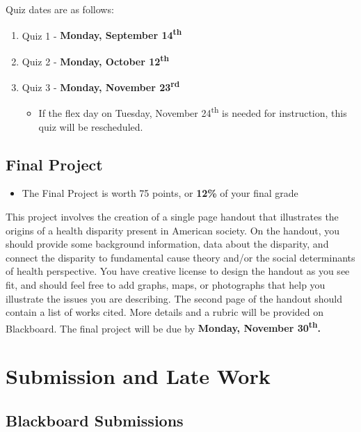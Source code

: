 \documentclass[
]{book}
\providecommand{\tightlist}{%
  \setlength{\itemsep}{0pt}\setlength{\parskip}{0pt}}
\newenvironment{rmdblock}[1]
  {\begin{shaded*}
  \begin{itemize}
  \renewcommand{\labelitemi}{
    \raisebox{-.7\height}[0pt][0pt]{
      {\setkeys{Gin}{width=3em,keepaspectratio}\texttt{[image: images/\#1]}}
    }
  }
  \item
  }
  {
  \end{itemize}
  \end{shaded*}
  }
\newenvironment{rmdtip}
  {\begin{rmdblock}{tip}}
  {\end{rmdblock}}
\begin{document}
Quiz dates are as follows:

\begin{enumerate}
\def\labelenumi{\arabic{enumi}.}
\tightlist
\item
  Quiz 1 - \textbf{Monday, September 14\textsuperscript{th}}
\item
  Quiz 2 - \textbf{Monday, October 12\textsuperscript{th}}
\item
  Quiz 3 - \textbf{Monday, November 23\textsuperscript{rd}}

  \begin{itemize}
  \tightlist
  \item
    If the flex day on Tuesday, November 24\textsuperscript{th} is needed for instruction, this quiz will be rescheduled.
  \end{itemize}
\end{enumerate}

\hypertarget{final-project}{%
\subsection{Final Project}\label{final-project}}

\begin{rmdtip}
The Final Project is worth 75 points, or \textbf{12\%} of your final
grade
\end{rmdtip}

This project involves the creation of a single page handout that illustrates the origins of a health disparity present in American society. On the handout, you should provide some background information, data about the disparity, and connect the disparity to fundamental cause theory and/or the social determinants of health perspective. You have creative license to design the handout as you see fit, and should feel free to add graphs, maps, or photographs that help you illustrate the issues you are describing. The second page of the handout should contain a list of works cited. More details and a rubric will be provided on Blackboard. The final project will be due by \textbf{Monday, November 30\textsuperscript{th}.}

\hypertarget{submission-and-late-work}{%
\section{Submission and Late Work}\label{submission-and-late-work}}

\hypertarget{blackboard-submissions}{%
\subsection{Blackboard Submissions}\label{blackboard-submissions}}
\end{document}

